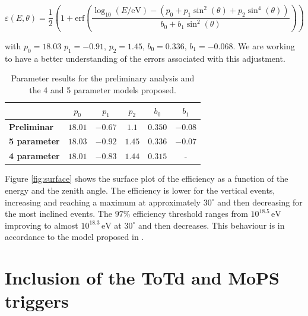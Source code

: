 \documentclass[12pt,a4paper]{article}
\newcommand{\eV}{\, \mathrm{eV}}
\begin{document}
\begin{equation}
\varepsilon(E,\theta)=\frac{1}{2}\left(1+\mathrm{erf}\left(\frac{\log_{10}(E/\mathrm{eV})-(p_0+p_1\sin^2(\theta)+p_2\sin^4(\theta))}{b_0+b_1\sin^2(\theta)}\right)\right)
\label{eqn:fitting}
\end{equation}

with $p_0=18.03$ $p_1=-0.91$, $p_2=1.45$, $b_0=0.336$, $b_1=-0.068$. We are working to have a better understanding of the errors associated with this adjustment.

\begin{table}[]
\begin{center}
\begin{tabular}{l|ccccc}
        & \textbf{$p_0$} & \textbf{$p_1$} & \textbf{$p_2$} & \textbf{$b_0$} & \textbf{$b_1$} \\ \hline
\textbf{Preliminar}  & $18.01$        & $-0.67$        & $1.1$          & $0.350$        & $-0.08$        \\
\textbf{5 parameter} & $18.03$        & $-0.92$        & $1.45$         & $0.336$        & $-0.07$        \\
\textbf{4 parameter} & $18.01$        & $-0.83$        & $1.44$         & $0.315$        & -             
\end{tabular}
\end{center}
\caption{Parameter results for the preliminary analysis and the 4 and 5 parameter models proposed.}
\label{tab:parameters}
\end{table}

Figure \ref{fig:surface} shows the surface plot of the efficiency as a function of the energy and the zenith angle. The efficiency is lower for the vertical events, increasing and reaching a maximum at approximately $30^{\circ}$ and then decreasing for the most inclined events. The $97\%$ efficiency threshold ranges from $10^{18.5}\eV$ improving to almost $10^{18.3}\eV$ at $30^{\circ}$ and then decreases. This behaviour is in accordance to the model proposed in \cite{VerticalSpectrum}.


\section{Inclusion of the ToTd and MoPS triggers}
\label{sec:new}
\end{document}
